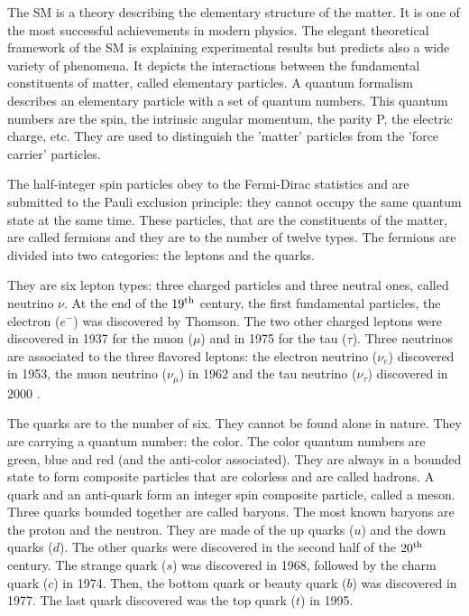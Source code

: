     The \acrfull{SM} is a theory describing the elementary structure of the matter. 
    It is one of the most successful achievements in modern physics.
    The elegant theoretical framework of the \gls{SM} is explaining experimental results but predicts also a wide variety of phenomena.
    It depicts the interactions between the fundamental constituents of matter, called elementary particles.
    A quantum formalism describes an elementary particle with a set of quantum numbers.
    This quantum numbers are the spin, the intrinsic angular momentum, the parity P, the electric charge, etc.
    They are used to distinguish the 'matter' particles from the 'force carrier' particles.
    
    The half-integer spin particles obey to the Fermi-Dirac statistics and are submitted to the Pauli exclusion principle: they cannot occupy the same quantum state at the same time.
    These particles, that are the constituents of the matter, are called fermions and they are to the number of twelve types.
    The fermions are divided into two categories: the leptons and the quarks. 
    
    They are six lepton types: three charged particles and three neutral ones, called neutrino $\nu$.
    At the end of the $19^{\rm{th}}$ century, the first fundamental particles, the electron ($e^{-}$) was discovered by Thomson.
    The two other charged leptons were discovered in 1937 for the muon ($\mu$) and in 1975 for the tau ($\tau$).
    Three neutrinos are associated to the three flavored leptons: the electron neutrino ($\nu_e$) discovered in 1953, the muon neutrino ($\nu_{\mu}$) in 1962 \cite{Erwin1961} and the tau neutrino ($\nu_{\tau}$) discovered in 2000 \cite{DONUT2000}.

    The quarks are to the number of six.
    They cannot be found alone in nature.
    They are carrying a quantum number: the color.
    The color quantum numbers are green, blue and red (and the anti-color associated).
    They are always in a bounded state to form composite particles that are colorless and are called hadrons.
    A quark and an anti-quark form an integer spin composite particle, called a meson.
    Three quarks bounded together are called baryons. The most known baryons are the proton and the neutron.
    They are made of the up quarks ($u$) and the down quarks ($d$).
    The other quarks were discovered in the second half of the $20^{\rm{th}}$ century.
    The strange quark ($s$) was discovered in 1968, followed by the charm quark ($c$) in 1974.
    Then, the bottom quark or beauty quark ($b$) was discovered in 1977.
    The last quark discovered was the top quark ($t$) in 1995.  


